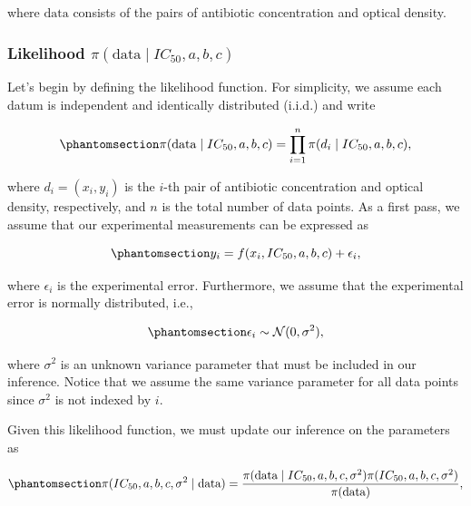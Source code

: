 \documentclass[
]{scrartcl}
\begin{document}
where \(\text{data}\) consists of the pairs of antibiotic concentration
and optical density.

\subsubsection{\texorpdfstring{Likelihood
\(\pi(\text{data} \mid IC_{50}, a, b, c)\)}{Likelihood \textbackslash pi(\textbackslash text\{data\} \textbackslash mid IC\_\{50\}, a, b, c)}}\label{likelihood-pitextdata-mid-ic_50-a-b-c}

Let's begin by defining the likelihood function. For simplicity, we
assume each datum is independent and identically distributed (i.i.d.)
and write

\begin{equation}\phantomsection\label{eq-iwasawa-likelihood}{
\pi(\text{data} \mid IC_{50}, a, b, c) = 
\prod_{i=1}^n \pi(d_i \mid IC_{50}, a, b, c),
}\end{equation}

where \(d_i = (x_i, y_i)\) is the \(i\)-th pair of antibiotic
concentration and optical density, respectively, and \(n\) is the total
number of data points. As a first pass, we assume that our experimental
measurements can be expressed as

\begin{equation}\phantomsection\label{eq-iwasawa-likelihood-model}{
y_i = f(x_i, IC_{50}, a, b, c) + \epsilon_i,
}\end{equation}

where \(\epsilon_i\) is the experimental error. Furthermore, we assume
that the experimental error is normally distributed, i.e.,

\begin{equation}\phantomsection\label{eq-iwasawa-likelihood-error}{
\epsilon_i \sim \mathcal{N}(0, \sigma^2),
}\end{equation}

where \(\sigma^2\) is an unknown variance parameter that must be
included in our inference. Notice that we assume the same variance
parameter for all data points since \(\sigma^2\) is not indexed by
\(i\).

Given this likelihood function, we must update our inference on the
parameters as

\begin{equation}\phantomsection\label{eq-iwasawa-likelihood-error-model}{
\pi(IC_{50}, a, b, c, \sigma^2 \mid \text{data}) = 
\frac{\pi(\text{data} \mid IC_{50}, a, b, c, \sigma^2) 
\pi(IC_{50}, a, b, c, \sigma^2)}
{\pi(\text{data})},
}\end{equation}
\end{document}
